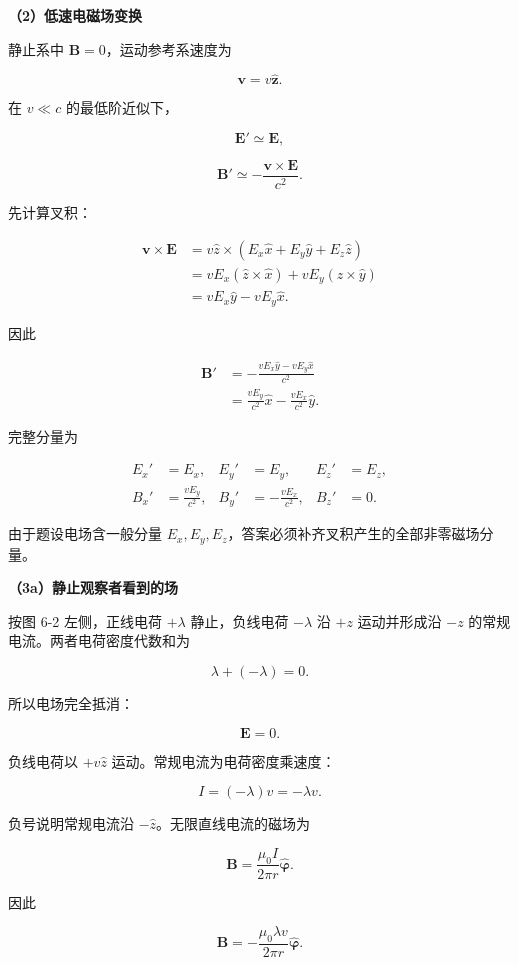 \documentclass[12pt,a4paper,UTF8]{ctexart}
\begin{document}
\textbf{（2）低速电磁场变换}

静止系中 \(\bm B=0\)，运动参考系速度为

\[\bm v=v\hat{\bm z}.\]

在 \(v\ll c\) 的最低阶近似下，

\[
\boxed{\bm E'\simeq\bm E},
\]

\[
\boxed{\bm B'\simeq-\frac{\bm v\times\bm E}{c^2}}.
\]

先计算叉积：

\[
\begin{aligned}
\bm v\times\bm E
&=v\hat z\times(E_x\hat x+E_y\hat y+E_z\hat z)\\
&=vE_x(\hat z\times\hat x)+vE_y(\hat z\times\hat y)\\
&=vE_x\hat y-vE_y\hat x.
\end{aligned}
\]

因此

\[
\begin{aligned}
\bm B'
&=-\frac{vE_x\hat y-vE_y\hat x}{c^2}\\
&=\frac{vE_y}{c^2}\hat x-\frac{vE_x}{c^2}\hat y.
\end{aligned}
\]

完整分量为

\[
\boxed{
\begin{aligned}
E_x'&=E_x,& E_y'&=E_y,& E_z'&=E_z,\\
B_x'&=\frac{vE_y}{c^2},&
B_y'&=-\frac{vE_x}{c^2},&
B_z'&=0.
\end{aligned}}
\]

由于题设电场含一般分量
\(E_x,E_y,E_z\)，答案必须补齐叉积产生的全部非零磁场分量。

\textbf{（3a）静止观察者看到的场}

按图 6-2 左侧，正线电荷 \(+\lambda\) 静止，负线电荷 \(-\lambda\) 沿
\(+z\) 运动并形成沿 \(-z\) 的常规电流。两者电荷密度代数和为

\[\lambda+(-\lambda)=0.\]

所以电场完全抵消：

\[
\boxed{\bm E=0}.
\]

负线电荷以 \(+v\hat z\) 运动。常规电流为电荷密度乘速度：

\[
I=(-\lambda)v=-\lambda v.
\]

负号说明常规电流沿 \(-\hat z\)。无限直线电流的磁场为

\[
\bm B=\frac{\mu_0I}{2\pi r}\hat{\bm\varphi}.
\]

因此

\[
\boxed{
\bm B=-\frac{\mu_0\lambda v}{2\pi r}\hat{\bm\varphi}
}.
\]
\end{document}
